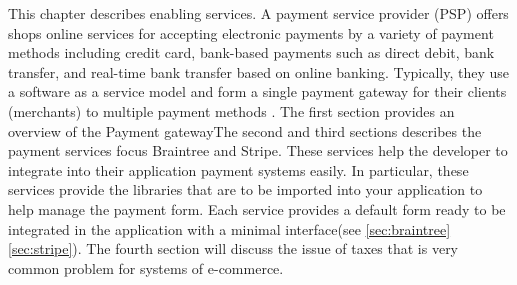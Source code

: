 This chapter describes enabling services.
\newline
A payment service provider (PSP) offers shops online services for accepting electronic payments by a variety of payment methods including credit card, bank-based payments such as direct debit, bank transfer, and real-time bank transfer based on online banking. Typically, they use a software as a service model and form a single payment gateway for their clients (merchants) to multiple payment methods \cite{payment_service_provider}.
\newline
The first section provides an overview of the Payment gatewayThe second and third sections describes the payment services focus Braintree and Stripe.
\newline
These services help the developer to integrate into their application payment systems easily. In particular, these services provide the libraries that are to be imported into your application to help manage the payment form. Each service provides a default form ready to be integrated in the application with a minimal interface(see \ref{sec:braintree} \ref{sec:stripe}).
\newline
The fourth section will discuss the issue of taxes that is very common problem for systems of e-commerce.